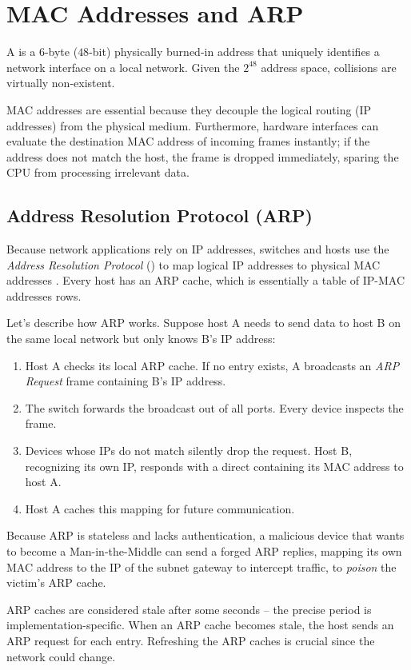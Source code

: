 \section{MAC Addresses and ARP}
A  is a \( 6 \)-byte (\( 48 \)-bit) physically burned-in address that uniquely identifies a network interface on a local network. Given the \( 2^{48} \) address space, collisions are virtually non-existent. 

MAC addresses are essential because they decouple the logical routing (IP addresses) from the physical medium. Furthermore, hardware interfaces can evaluate the destination MAC address of incoming frames instantly; if the address does not match the host, the frame is dropped immediately, sparing the CPU from processing irrelevant data.

\subsection{Address Resolution Protocol (ARP)}
Because network applications rely on IP addresses, switches and hosts use the \emph{Address Resolution Protocol} () to map logical IP addresses to physical MAC addresses \cite{rfc826}.
Every host has an ARP cache, which is essentially a table of IP-MAC addresses rows.

Let's describe how ARP works. Suppose host A needs to send data to host B on the same local network but only knows B's IP address:
\begin{enumerate}
    \item Host A checks its local ARP cache. If no entry exists, A broadcasts an \emph{ARP Request} frame containing B's IP address.
    \item The switch forwards the broadcast out of all ports. Every device inspects the frame.
    \item Devices whose IPs do not match silently drop the request. Host B, recognizing its own IP, responds with a direct  containing its MAC address to host A.
    \item Host A caches this mapping for future communication.
\end{enumerate}

Because ARP is stateless and lacks authentication, a malicious device that wants to become a Man-in-the-Middle can send a forged ARP replies, mapping its own MAC address to the IP of the subnet gateway to intercept traffic, to \emph{poison} the victim's ARP cache.

ARP caches are considered stale after some seconds -- the precise period is implementation-specific. When an ARP cache becomes stale, the host sends an ARP request for each entry.
Refreshing the ARP caches is crucial since the network could change.

